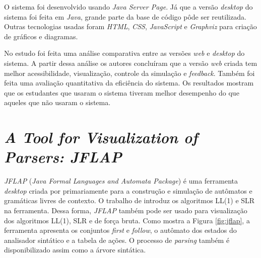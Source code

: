 O sistema foi desenvolvido usando \textit{Java Server Page}. Já que a versão \textit{desktop} do sistema foi feita em \textit{Java}, grande parte da base de código pôde ser reutilizada. Outras tecnologias usadas foram \textit{HTML}, \textit{CSS}, \textit{JavaScript} e \textit{Graphviz} para criação de gráficos e diagramas.

No estudo foi feita uma análise comparativa entre as versões \textit{web} e \textit{desktop} do sistema. A partir dessa análise os autores concluíram que a versão \textit{web} criada tem melhor acessibilidade, visualização, controle da simulação e \textit{feedback}. Também foi feita uma avaliação quantitativa da eficiência do sistema. Os resultados mostram que os estudantes que usaram o sistema tiveram melhor desempenho do que aqueles que não usaram o sistema.

\section{\textit{A Tool for Visualization of Parsers: \textit{JFLAP}}}
\textit{JFLAP} (\textit{Java Formal Languages and Automata Package}) é uma ferramenta \textit{desktop} criada por \textcite{jflap} primariamente para a construção e simulação de autômatos e gramáticas livres de contexto. O trabalho de \textcite{jflapparser} introduz os algoritmos LL(1) e SLR na ferramenta. Dessa forma, \textit{JFLAP} também pode ser usado para visualização dos algoritmos LL(1), SLR e de força bruta. Como mostra a Figura \ref{fig:jflap}, a ferramenta apresenta os conjuntos \textit{first} e \textit{follow}, o autômato dos estados do analisador sintático e a tabela de ações. O processo de \textit{parsing} também é disponibilizado assim como a árvore sintática.

\begin{figure}[ht]
    \captionsetup{width=16cm}
\end{figure}


